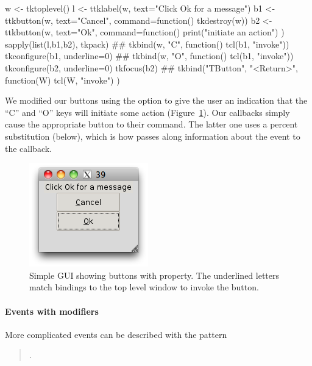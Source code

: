 \begin{Schunk}
\begin{Sinput}
 w <- tktoplevel()
 l <- ttklabel(w, text="Click Ok for a message")
 b1 <- ttkbutton(w, text="Cancel", 
                 command=function() tkdestroy(w))
 b2 <- ttkbutton(w, text="Ok", command=function() {
   print("initiate an action")
 })
 sapply(list(l,b1,b2), tkpack)
 ##
 tkbind(w, "C", function() tcl(b1, "invoke"))
 tkconfigure(b1, underline=0)
 ##
 tkbind(w, "O", function() tcl(b1, "invoke"))
 tkconfigure(b2, underline=0)
 tkfocus(b2)
 ##
 tkbind("TButton", "<Return>", function(W) {
   tcl(W, "invoke")
 })
\end{Sinput}
\end{Schunk}
%
We modified our buttons using the  option to give the
user an indication that the ``C'' and ``O'' keys will initiate some
action (Figure~\ref{fig:tcltk-underline-buttons}). Our callbacks
simply cause the appropriate button to  their
command. The latter one uses a percent substitution (below), which is
how \TK\/ passes along information about the event to the callback.

\begin{figure}
  \centering
  \includegraphics[width=.35\textwidth]{fig-tcltk-underline-buttons.png}
  \caption{Simple GUI showing buttons with 
    property. The underlined letters match bindings to the top level
    window to invoke the button.}
  \label{fig:tcltk-underline-buttons}
\end{figure}

\paragraph{Events with modifiers}
More complicated events can be described with the pattern

\begin{quotation}
.   
\end{quotation}

